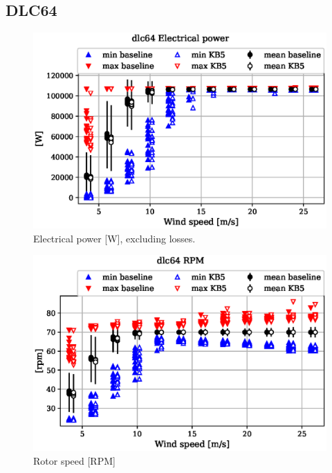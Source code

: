 
\subsection{DLC64}
\label{sec:baseline-vs-KB6:dlc64}

\begin{figure}[!ht]
\begin{center}
	\includegraphics[width=.85\linewidth]{figures/baseline-vs-KB6/dlc64/DLL-generator_servo-inpvec-2_AA0008_AA0008.eps}
\end{center}
\caption{Electrical power [W], excluding losses.}
\label{fig:baseline-vs-KB6:dlc64:power}
\end{figure}

\begin{figure}[!ht]
\begin{center}
	\includegraphics[width=.85\linewidth]{figures/baseline-vs-KB6/dlc64/bearing-shaft_rot-angle_speed-rpm_AA0008_AA0008.eps}
\end{center}
\caption{Rotor speed [RPM]}
\label{fig:baseline-vs-KB6:dlc64:rpm}
\end{figure}


